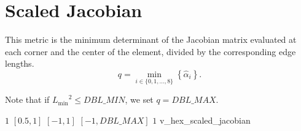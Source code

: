 \section{Scaled Jacobian}

This metric is the minimum determinant of the Jacobian matrix
evaluated at each corner and the center of the element,
divided by the corresponding edge lengths.
\[
q = \min_{i\in\{0,1,\ldots,8\}}\left\{\hat\alpha_i\right\}.
\]

Note that if ${L_{\min}}^2 \leq DBL\_MIN$, we set $q = DBL\_MAX$.

%
{$1$}%
{$[0.5,1]$}%
{$[-1,1]$}%
{$[-1,DBL\_MAX]$}%
{$1$}%
{\cite{knu:00}}%
{v\_hex\_scaled\_jacobian}%
